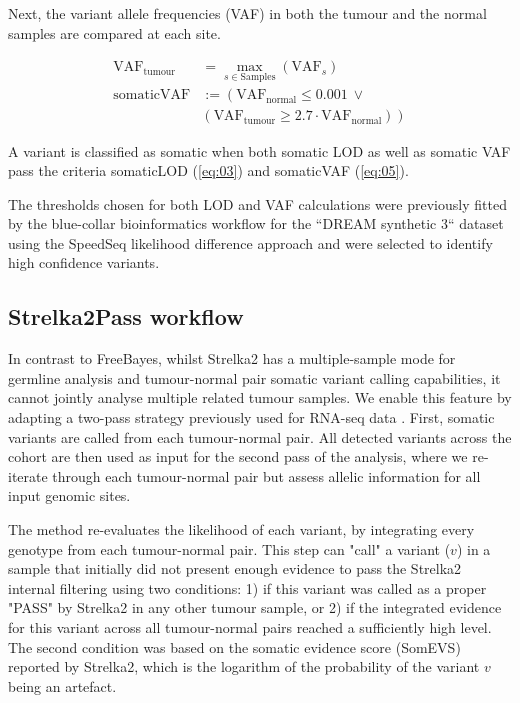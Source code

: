 Next, the variant allele frequencies (VAF) in both the tumour and the normal samples are compared at each site.


\begin{align}
\text{VAF}_{\text{tumour}} &= \max_{s \in \text{Samples}} ( \text{VAF}_s) \label{eq:04}\\
\text{somaticVAF} & := \left( \text{VAF}_{\text{normal}} \leq 0.001 ~\lor \right. \nonumber \\
 & \left. ( \text{VAF}_{\text{tumour}} \geq 2.7 \cdot \text{VAF}_{\text{normal}}) \right) \label{eq:05}
\end{align}

A variant is classified as somatic when both somatic LOD as well as somatic VAF pass the criteria somaticLOD (\autoref{eq:03}) and somaticVAF (\autoref{eq:05}).

The thresholds chosen for both LOD and VAF calculations were previously fitted by the blue-collar bioinformatics workflow for the ``DREAM synthetic 3`` dataset using the SpeedSeq likelihood difference approach \parencite{Chapman2020} and were selected to identify high confidence variants.

\subsection{Strelka2Pass workflow}
In contrast to FreeBayes, whilst Strelka2 has a multiple-sample mode for germline analysis and tumour-normal pair somatic variant calling capabilities, it cannot jointly analyse multiple related tumour samples. We enable this feature by adapting a two-pass strategy previously used for RNA-seq data \parencite{Veeneman2015}. First, somatic variants are called from each tumour-normal pair. All detected variants across the cohort are then used as input for the second pass of the analysis, where we re-iterate through each tumour-normal pair but assess allelic information for all input genomic sites.

The method re-evaluates the likelihood of each variant, by integrating every genotype from each tumour-normal pair. This step can "call" a variant ($v$) in a sample that initially did not present enough evidence to pass the Strelka2 internal filtering using two conditions: 1) if this variant was called as a proper "PASS" by Strelka2 in any other tumour sample, or 2) if the integrated evidence for this variant across all tumour-normal pairs reached a sufficiently high level. The second condition was based on the somatic evidence score (SomEVS) reported by Strelka2, which is the logarithm of the probability of the variant $v$ being an artefact.

